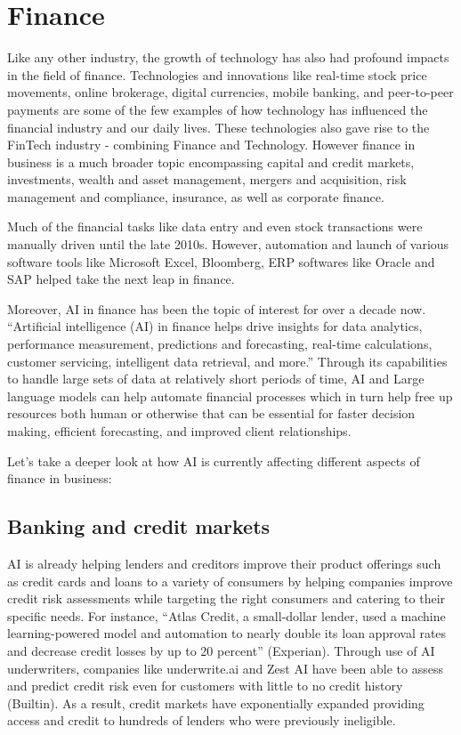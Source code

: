 \documentclass[
]{article}
\begin{document}
\hypertarget{finance}{%
\section{Finance}\label{finance}}

Like any other industry, the growth of technology has also had profound impacts in the field of finance. Technologies and innovations like real-time stock price movements, online brokerage, digital currencies, mobile banking, and peer-to-peer payments are some of the few examples of how technology has influenced the financial industry and our daily lives. These technologies also gave rise to the FinTech industry - combining Finance and Technology. However finance in business is a much broader topic encompassing capital and credit markets, investments, wealth and asset management, mergers and acquisition, risk management and compliance, insurance, as well as corporate finance.

Much of the financial tasks like data entry and even stock transactions were manually driven until the late 2010s. However, automation and launch of various software tools like Microsoft Excel, Bloomberg, ERP softwares like Oracle and SAP helped take the next leap in finance.

Moreover, AI in finance has been the topic of interest for over a decade now. ``Artificial intelligence (AI) in finance helps drive insights for data analytics, performance measurement, predictions and forecasting, real-time calculations, customer servicing, intelligent data retrieval, and more.'' Through its capabilities to handle large sets of data at relatively short periods of time, AI and Large language models can help automate financial processes which in turn help free up resources both human or otherwise that can be essential for faster decision making, efficient forecasting, and improved client relationships.

Let's take a deeper look at how AI is currently affecting different aspects of finance in business:

\hypertarget{banking-and-credit-markets}{%
\subsection{Banking and credit markets}\label{banking-and-credit-markets}}

AI is already helping lenders and creditors improve their product offerings such as credit cards and loans to a variety of consumers by helping companies improve credit risk assessments while targeting the right consumers and catering to their specific needs. For instance, ``Atlas Credit, a small-dollar lender, used a machine learning-powered model and automation to nearly double its loan approval rates and decrease credit losses by up to 20 percent'' (Experian). Through use of AI underwriters, companies like underwrite.ai and Zest AI have been able to assess and predict credit risk even for customers with little to no credit history (Builtin). As a result, credit markets have exponentially expanded providing access and credit to hundreds of lenders who were previously ineligible.
\end{document}
